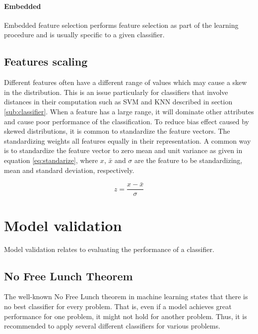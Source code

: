 \documentclass[USenglish]{ifimaster}  %
\begin{document}
\paragraph{Embedded}
Embedded feature selection performs feature selection as part of the learning procedure and is usually specific to a given classifier.

\subsection{Features scaling} \label{subsec:scaling}
Different features often have a different range of values which may cause a skew in the distribution. This is an issue particularly for classifiers that involve distances in their computation such as SVM and KNN described in section \ref{sub:classifier}. When a feature has a large range, it will dominate other attributes and cause poor performance of the classification. To reduce bias effect caused by skewed distributions, it is common to standardize the feature vectors. The standardizing weights all features equally in their representation. A common way is to standardize the feature vector to zero mean and unit variance as given in equation \ref{eq:standarize}, where $x$, $\bar{x}$ and $\sigma$ are the feature to be standardizing, mean and standard deviation, respectively. 


\begin{equation}
z = \frac{x-\bar{x}}{\sigma}
\label{eq:standarize}
\end{equation}


	
\section{Model validation}
Model validation relates to evaluating the performance of a classifier. 
	
\subsection{No Free Lunch Theorem} \label{seq:nofree}
The well-known No Free Lunch theorem \cite{NOFREELUNCH} in machine learning states that there is no best classifier for every problem. That is, even if a model achieves great performance for one problem, it might not hold for another problem. Thus, it is recommended to apply several different classifiers for various problems.
	
\end{document}
